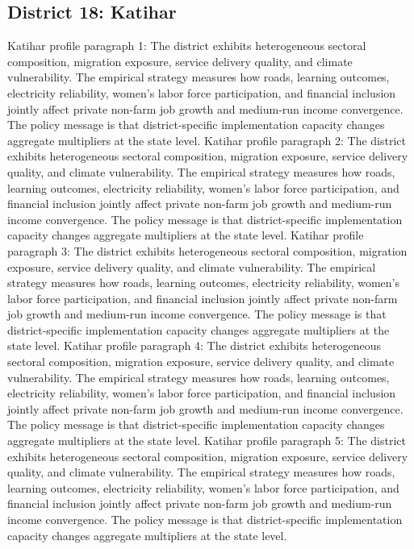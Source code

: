 \documentclass[preprint,12pt]{elsarticle}
\begin{document}
\subsection{District 18: Katihar}
Katihar profile paragraph 1: The district exhibits heterogeneous sectoral composition, migration exposure, service delivery quality, and climate vulnerability. The empirical strategy measures how roads, learning outcomes, electricity reliability, women's labor force participation, and financial inclusion jointly affect private non-farm job growth and medium-run income convergence. The policy message is that district-specific implementation capacity changes aggregate multipliers at the state level.
Katihar profile paragraph 2: The district exhibits heterogeneous sectoral composition, migration exposure, service delivery quality, and climate vulnerability. The empirical strategy measures how roads, learning outcomes, electricity reliability, women's labor force participation, and financial inclusion jointly affect private non-farm job growth and medium-run income convergence. The policy message is that district-specific implementation capacity changes aggregate multipliers at the state level.
Katihar profile paragraph 3: The district exhibits heterogeneous sectoral composition, migration exposure, service delivery quality, and climate vulnerability. The empirical strategy measures how roads, learning outcomes, electricity reliability, women's labor force participation, and financial inclusion jointly affect private non-farm job growth and medium-run income convergence. The policy message is that district-specific implementation capacity changes aggregate multipliers at the state level.
Katihar profile paragraph 4: The district exhibits heterogeneous sectoral composition, migration exposure, service delivery quality, and climate vulnerability. The empirical strategy measures how roads, learning outcomes, electricity reliability, women's labor force participation, and financial inclusion jointly affect private non-farm job growth and medium-run income convergence. The policy message is that district-specific implementation capacity changes aggregate multipliers at the state level.
Katihar profile paragraph 5: The district exhibits heterogeneous sectoral composition, migration exposure, service delivery quality, and climate vulnerability. The empirical strategy measures how roads, learning outcomes, electricity reliability, women's labor force participation, and financial inclusion jointly affect private non-farm job growth and medium-run income convergence. The policy message is that district-specific implementation capacity changes aggregate multipliers at the state level.
\end{document}

